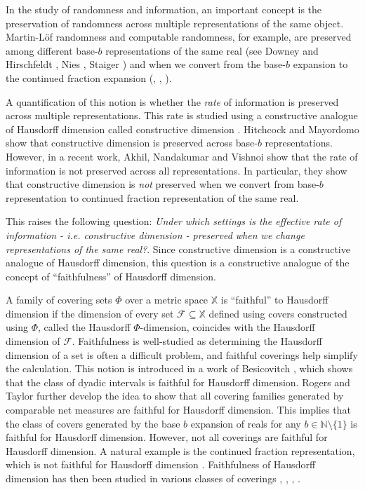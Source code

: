 \documentclass[11pt]{article}
\newcommand{\N}{\mathbb{N}}
\newcommand{\F}{{\mathcal{F}}}
\newcommand{\X}{{\mathbb{X}}}
\renewcommand{\F}{\mathcal{F}}
\begin{document}
In the study of randomness and information, an important concept is
the preservation of randomness across multiple representations of the
same object. Martin-L\"of randomness and computable randomness, for
example, are preserved among different base-$b$ representations of the
same real (see Downey and Hirschfeldt \cite{Downey10}, Nies
\cite{Nies2009}, Staiger \cite{Staiger02}) and when we convert from
the base-$b$ expansion to the continued fraction expansion
(\cite{Nandakumar2008a}, \cite{NANDAKUMAR2022104876},
\cite{Nandakumar2020c}).

A quantification of this notion is whether the \emph{rate} of
information is preserved across multiple
representations. This rate is studied using a constructive analogue of Hausdorff dimension called constructive dimension \cite{Lutz2003b}\cite{Mayordomo02}.
Hitchcock and Mayordomo \cite{HitchMayor13} show that  
constructive
dimension is preserved across base-$b$ representations. However, in a
recent work, Akhil, Nandakumar and Vishnoi \cite{Nandakumar2023b} show
that the rate of information is not preserved across all
representations. In particular, they show that constructive dimension
is \emph{not} preserved when we convert from base-$b$ representation
to continued fraction representation of the same real.

This raises the following question: \emph{Under which settings is the
	effective rate of information - \emph{i.e.} constructive dimension -
	preserved when we change representations of the same real?}. Since
constructive dimension is a constructive analogue of Hausdorff
dimension, this question is a constructive analogue of the concept of
``faithfulness'' of Hausdorff dimension.

A family of covering sets $\Phi$ over a metric space $\X$ is ``faithful'' to Hausdorff dimension if the  dimension of every
set $\F \subseteq \X$ defined using covers constructed using $\Phi$, called the Hausdorff
$\Phi$-dimension, coincides with the Hausdorff dimension of $\F$.   Faithfulness is well-studied as determining the
Hausdorff dimension of a set is often a difficult problem, and
faithful coverings help simplify the calculation. This
notion is introduced in a work of Besicovitch \cite{Besicovitch52},
which shows that the class of dyadic intervals is faithful for
Hausdorff dimension. Rogers and Taylor
\cite{Rogers70} further develop the idea to show that all covering
families generated by comparable net measures are faithful for
Hausdorff dimension. This implies that the class of covers generated
by the base $b$ expansion of reals for any $b \in \N \setminus \{1\}$
is faithful for Hausdorff dimension. However, not all coverings are
faithful for Hausdorff dimension. A natural example is the continued
fraction representation, which is not faithful for Hausdorff dimension
\cite{PeresTorbin}. Faithfulness of Hausdorff dimension has then
been studied in various classes of coverings \cite{Albeverio2020},
\cite{Albeverio05}, \cite{IbragimTorbin15}, \cite{PeresTorbin}.
\end{document}
